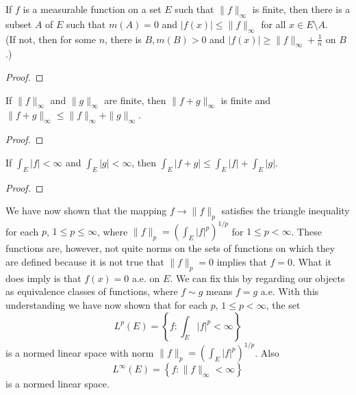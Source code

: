 \begin{pblm}%
	If $f$ is a measurable function on a set $E$ such that $\|f\|_\infty$ is finite, then 
	there is a subset $A$ of $E$ such that $m(A) = 0$ and $|f(x)| \le \|f\|_\infty$ for all 
	$x \in E\setminus A$. \\
	(If not, then for some $n$, there is $B, m(B) > 0$ and $|f(x)|\ge\|f\|_\infty + \frac{1}{n}$ 
	on $B$.)
\begin{proof}
\end{proof}
\end{pblm}

\begin{pblm}%
	If $\|f\|_\infty$ and $\|g\|_\infty$ are finite, then $\|f+g\|_\infty$ is finite and 
	$\|f+g\|_\infty \le \|f\|_\infty+\|g\|_\infty$. 
\begin{proof}
\end{proof}
\end{pblm}

\begin{pblm}%
	If $\int_E|f|<\infty$ and $\int_E|g|<\infty$, then $\int_E|f+g|\le\int_E|f|+\int_E|g|$. 
\begin{proof}
\end{proof}
\end{pblm}

\begin{rmk}%
	We have now shown that the mapping $f\rightarrow \|f\|_p$ satisfies the triangle 
	inequality for each $p$, $1\le p\le\infty$, where $\|f\|_p = (\int_E|f|^p)^{1/p}$ 
	for $1 \le p < \infty$. These functions are, however, not quite norms on the sets of 
	functions on which they are defined because it is not true that $\|f\|_p = 0$ implies 
	that $f = 0$. What it does imply is that $f(x) = 0$ a.e. on $E$. We can fix this by 
	regarding our objects as equivalence classes of functions, where $f \sim g$ means 
	$f = g$ a.e. With this understanding we have now shown that for each $p$, 
	$1 \le p < \infty$, the set 
	\begin{equation*}
		L^p(E) = \left\{f:\int_E|f|^p < \infty \right\}
	\end{equation*}
	is a normed linear space with norm $\|f\|_p = (\int_E|f|^p)^{1/p}$. Also 
	\begin{equation*}
		L^\infty(E) = \left\{f:\|f\|_\infty < \infty \right\}
	\end{equation*}
	is a normed linear space. 
\end{rmk}

